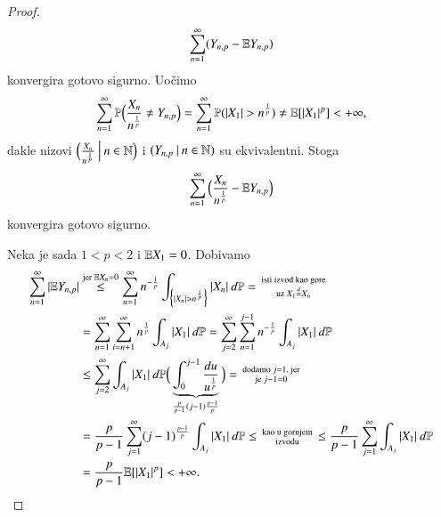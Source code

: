 \begin{proof}
\begin{equation*}
        \sum\limits_{n = 1}^{\infty} (Y_{n, p} - \mathbb{E} Y_{n, p})
    \end{equation*}
    konvergira gotovo sigurno.
    Uo\v cimo
    \begin{equation*}
        \sum\limits_{n = 1}^{\infty} \mathbb{P} \Big( \frac{X_n}{n^\frac{1}{p}} \neq Y_{n, p} \Big) = \sum\limits_{n = 1}^{\infty} \mathbb{P} (|X_1| > n^\frac{1}{p}) \neq \mathbb{E} [ |X_1|^p ] < +\infty,
    \end{equation*}
    dakle nizovi $\Big( {\frac{X_n}{n^\frac{1}{p}}} \: \Big| \: {n \in \mathbb{N}} \Big)$ i $({Y_{n, p}} \: | \: {n \in \mathbb{N}})$ su ekvivalentni.
    Stoga
    \begin{equation*}
        \sum\limits_{n = 1}^{\infty} \Big( \frac{X_n}{n^\frac{1}{p}} - \mathbb{E} Y_{n, p} \Big)
    \end{equation*}
    konvergira gotovo sigurno.

    Neka je sada $1 < p < 2$ i $\mathbb{E} X_1 = 0$.
    Dobivamo
    \begin{equation*}
        \begin{aligned}
            \sum\limits_{n = 1}^{\infty} |\mathbb{E} Y_{n, p}| &\overset{\textnormal{jer } \mathbb{E} X_n = 0}{\leq}
            \sum\limits_{n = 1}^{\infty} n^{-\frac{1}{p}}
            \int_{\Big\{ |X_n| > n^\frac{1}{p} \Big\}} |X_n| \: d \mathbb{P} =
            \begin{smallmatrix}
                \textnormal{isti izvod kao gore}\\
                \textnormal{uz } X_1 \overset{d}{=} X_n
            \end{smallmatrix}\\
            &= \sum\limits_{n = 1}^{\infty} \sum\limits_{i = n + 1}^{\infty} n^\frac{1}{p} \int_{A_j} |X_1| \: d \mathbb{P} = \sum\limits_{j = 2}^{\infty} \sum\limits_{n = 1}^{j - 1} n^{-\frac{1}{p}} \int_{A_j} |X_1| \: d \mathbb{P}\\
            &\leq \sum\limits_{j = 2}^{\infty} \int_{A_j} |X_1| \: d \mathbb{P} \Big( \underbrace{\int_0^{j-1} \frac{du}{u^\frac{1}{p}} }_{\frac{p}{p - 1} (j - 1)\frac{p - 1}{p}} \Big) =
            \begin{smallmatrix}
                \textnormal{dodamo } j = 1 \textnormal{, jer}\\
                \textnormal{je } j - 1 = 0
            \end{smallmatrix}\\
            &= \frac{p}{p - 1} \sum\limits_{j = 1}^{\infty} (j - 1)^\frac{p - 1}{p} \int_{A_j} |X_1| \: d \mathbb{P} \leq
            \begin{smallmatrix}
                \textnormal{kao u gornjem}\\
                \textnormal{izvodu}
            \end{smallmatrix}
            \leq \frac{p}{p - 1} \sum\limits_{j = 1}^{\infty} \int_{A_j} |X_1| \: d \mathbb{P}\\
            &= \frac{p}{p - 1} \mathbb{E} [ |X_1|^p ] < + \infty.
        \end{aligned}
    \end{equation*}
\end{proof}

